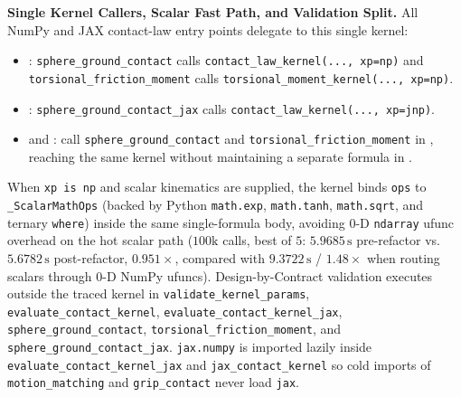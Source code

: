 \documentclass[11pt,a4paper]{article}
\begin{document}
\textbf{Single Kernel Callers, Scalar Fast Path, and Validation Split.}
All NumPy and JAX contact-law entry points delegate to this single kernel:
\begin{itemize}[leftmargin=*,noitemsep]
\item {}: \texttt{sphere\_ground\_contact} calls \texttt{contact\_law\_kernel(..., xp=np)} and \texttt{torsional\_friction\_moment} calls \texttt{torsional\_moment\_kernel(..., xp=np)}.
\item {}: \texttt{sphere\_ground\_contact\_jax} calls \texttt{contact\_law\_kernel(..., xp=jnp)}.
\item {} and : call \texttt{sphere\_ground\_contact} and \texttt{torsional\_friction\_moment} in , reaching the same kernel without maintaining a separate formula in .
\end{itemize}
When \texttt{xp is np} and scalar kinematics are supplied, the kernel binds \texttt{ops} to \texttt{\_ScalarMathOps} (backed by Python \texttt{math.exp}, \texttt{math.tanh}, \texttt{math.sqrt}, and ternary \texttt{where}) inside the same single-formula body, avoiding $0$-D \texttt{ndarray} ufunc overhead on the hot scalar path ($100\text{k}$ calls, best of $5$: $5.9685\,\mathrm{s}$ pre-refactor vs.\ $5.6782\,\mathrm{s}$ post-refactor, $0.951\times$, compared with $9.3722\,\mathrm{s}$ / $1.48\times$ when routing scalars through $0$-D NumPy ufuncs). Design-by-Contract validation executes outside the traced kernel in \texttt{validate\_kernel\_params}, \texttt{evaluate\_contact\_kernel}, \texttt{evaluate\_contact\_kernel\_jax}, \texttt{sphere\_ground\_contact}, \texttt{torsional\_friction\_moment}, and \texttt{sphere\_ground\_contact\_jax}. \texttt{jax.numpy} is imported lazily inside \texttt{evaluate\_contact\_kernel\_jax} and \texttt{jax\_contact\_kernel} so cold imports of \texttt{motion\_matching} and \texttt{grip\_contact} never load \texttt{jax}.
\end{document}
